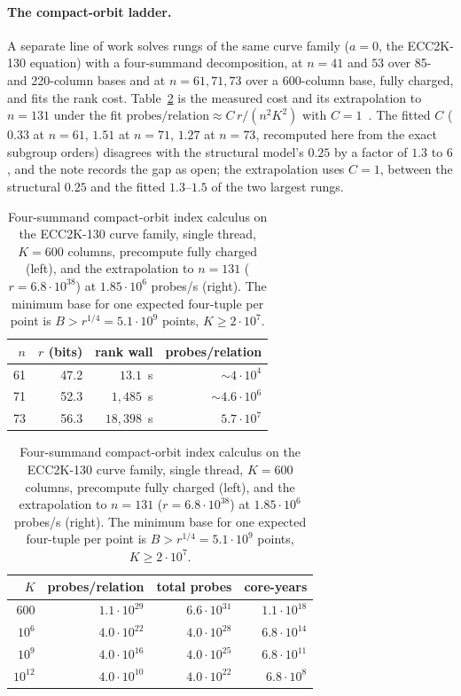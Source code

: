 \paragraph{The compact-orbit ladder.} A separate line of work solves rungs of the same curve family ($a=0$,
the ECC2K-130 equation) with a four-summand decomposition, at $n=41$
and $53$ over 85- and 220-column bases and at $n=61,71,73$ over a
600-column base, fully charged, and fits the rank cost. Table~\ref{tab:ic-rungs}
is the measured cost and its extrapolation to $n=131$ under the fit
$\text{probes/relation}\approx C\,r/(n^2K^2)$ with
$C=1$~. The fitted $C$ ($0.33$ at $n=61$, $1.51$ at $n=71$, $1.27$ at $n=73$,
recomputed here from the exact subgroup orders) disagrees with the
structural model's $0.25$ by a factor of $1.3$ to $6$, and the note
records the gap as open; the extrapolation uses $C=1$, between the
structural $0.25$ and the fitted $1.3$--$1.5$ of the two largest
rungs.

\begin{table}[t]
\centering
\small
\caption{Four-summand compact-orbit index calculus on the ECC2K-130
  curve family, single thread, $K=600$ columns, precompute fully
  charged (left), and the extrapolation to $n=131$ ($r=6.8\cdot10^{38}$)
  at $1.85\cdot10^6$ probes/s (right). The minimum base for one
  expected four-tuple per point is $B>r^{1/4}=5.1\cdot10^9$ points,
  $K\ge2\cdot10^7$.}
\label{tab:ic-rungs}
\begin{tabular}{@{}rrrr@{}}
\toprule
$n$ & $r$ (bits) & rank wall & probes/relation \\
\midrule
61 & 47.2 & $13.1$~s & $\sim4\cdot10^4$ \\
71 & 52.3 & $1{,}485$~s & $\sim4.6\cdot10^6$ \\
73 & 56.3 & $18{,}398$~s & $5.7\cdot10^7$ \\
\bottomrule
\end{tabular}
\hspace{1.5em}
\begin{tabular}{@{}rrrr@{}}
\toprule
$K$ & probes/relation & total probes & core-years \\
\midrule
$600$ & $1.1\cdot10^{29}$ & $6.6\cdot10^{31}$ & $1.1\cdot10^{18}$ \\
$10^6$ & $4.0\cdot10^{22}$ & $4.0\cdot10^{28}$ & $6.8\cdot10^{14}$ \\
$10^9$ & $4.0\cdot10^{16}$ & $4.0\cdot10^{25}$ & $6.8\cdot10^{11}$ \\
$10^{12}$ & $4.0\cdot10^{10}$ & $4.0\cdot10^{22}$ & $6.8\cdot10^{8}$ \\
\bottomrule
\end{tabular}
\end{table}

